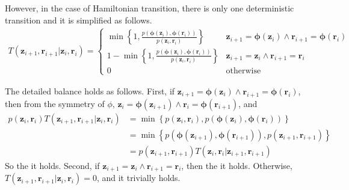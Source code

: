 \documentclass[a4]{article}
\begin{document}
However, in the case of Hamiltonian transition, there is only one deterministic
transition and it is simplified as follows.
\begin{equation}
\begin{aligned}
T\left(\bm{z}_{i+1}, \bm{r}_{i+1}|\bm{z}_{i}, \bm{r}_{i}\right) = 
    \begin{cases}
        \min \left\{ 1,
            \frac{ p( \bm{\phi}(\bm{z}_i), \bm{\phi}(\bm{r}_i) ) }
                 { p( \bm{z}_i, \bm{r}_i ) } \right\}
 & \bm{z}_{i+1} = \bm{\phi}(\bm{z}_i) \wedge
   \bm{r}_{i+1} = \bm{\phi}(\bm{r}_i)\\
        1 - \min \left\{ 1,
            \frac{ p( \bm{\phi}(\bm{z}_i), \bm{\phi}(\bm{r}_i) ) }
                 { p( \bm{z}_i, \bm{r}_i ) } \right\}
 & \bm{z}_{i+1} = \bm{z}_i \wedge \bm{r}_{i+1} = \bm{r}_i\\
        0 & \text{otherwise}
    \end{cases}
\end{aligned}
\end{equation}

The detailed balance holds as follows.
First, if  $\bm{z}_{i+1} = \bm{\phi}(\bm{z}_i) \wedge 
     \bm{r}_{i+1} = \bm{\phi}(\bm{r}_i)$, then from the symmetry of $\phi$,
$\bm{z}_{i} = \bm{\phi}(\bm{z}_{i+1}) \wedge 
 \bm{r}_{i} = \bm{\phi}(\bm{r}_{i+1})$, and
\begin{equation}
\begin{aligned}
    p\left(\bm{z}_i, \bm{r}_i\right)
    T\left(\bm{z}_{i+1}, \bm{r}_{i+1}|\bm{z}_{i}, \bm{r}_{i}\right)
&= 
    \min \left\{
           p( \bm{z}_i, \bm{r}_i ),
           p( \bm{\phi}(\bm{z}_i), \bm{\phi}(\bm{r}_i) )
          \right\}\\
&= 
    \min \left\{
           p( \bm{\phi}(\bm{z}_{i+1}), \bm{\phi}(\bm{r}_{i+1}) ),
           p( \bm{z}_{i+1}, \bm{r}_{i+1} )
          \right\}\\
&=
    p\left(\bm{z}_{i+1}, \bm{r}_{i+1}\right)
    T\left(\bm{z}_{i}, \bm{r}_{i}|\bm{z}_{i+1}, \bm{r}_{i+1}\right)
\end{aligned}
\end{equation}
So the it holds.
Second, if $\bm{z}_{i+1} = \bm{z}_i \wedge \bm{r}_{i+1} = \bm{r}_i$, then
the it holds.
Otherwise,
$T\left(\bm{z}_{i+1}, \bm{r}_{i+1}|\bm{z}_{i}, \bm{r}_{i}\right) = 0$, and
it trivially holds.
\end{document}
